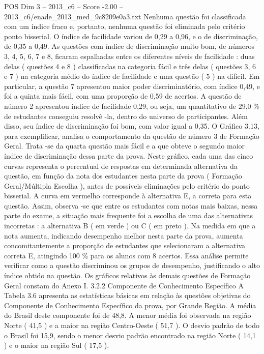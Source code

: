 \begin{textsample}{POS Dim 3 – 2013\_c6 – Score -2.00 – 2013\_c6/enade\_2013\_med\_9c8209e0a3.txt}
Nenhuma questão foi classificada com um índice fraco e, portanto, nenhuma questão foi eliminada pelo critério ponto bisserial.
O índice de facilidade variou de 0,29 a 0,96, e o de discriminação, de 0,35 a 0,49.
As questões com índice de discriminação muito bom, de números 3, 4, 5, 6, 7 e 8, ficaram espalhadas entre os diferentes níveis de facilidade : duas delas ( questões 4 e 8 ) classificadas na categoria fácil e três delas ( questões 3, 6 e 7 ) na categoria médio do índice de facilidade e uma questão ( 5 ) na difícil.
Em particular, a questão 7 apresentou maior poder discriminatório, com índice 0,49, e foi a quinta mais fácil, com uma proporção de 0,59 de acertos.
A questão de número 2 apresentou índice de facilidade 0,29, ou seja, um quantitativo de 29,0 \% de estudantes conseguiu resolvê -la, dentro do universo de participantes.
Além disso, seu índice de discriminação foi bom, com valor igual a 0,35.
O Gráfico 3.13, para exemplificar, analisa o comportamento da questão de número 3 de Formação Geral.
Trata -se da quarta questão mais fácil e a que obteve o segundo maior índice de discriminação dessa parte da prova.
Neste gráfico, cada uma das cinco curvas representa o percentual de respostas em determinada alternativa da questão, em função da nota dos estudantes nesta parte da prova ( Formação Geral/Múltipla Escolha ), antes de possíveis eliminações pelo critério do ponto bisserial.
A curva em vermelho corresponde à alternativa E, a correta para esta questão.
Assim, observa -se que entre os estudantes com notas mais baixas, nessa parte do exame, a situação mais frequente foi a escolha de uma das alternativas incorretas : a alternativa B ( em verde ) ou C ( em preto ).
Na medida em que a nota aumenta, indicando desempenho melhor nesta parte da prova, aumenta concomitantemente a proporção de estudantes que selecionaram a alternativa correta E, atingindo 100 \% para os alunos com 8 acertos.
Essa análise permite verificar como a questão discriminou os grupos de desempenho, justificando o alto índice obtido na questão.
Os gráficos relativos às demais questões de Formação Geral constam do Anexo I. 3.2.2 Componente de Conhecimento Específico A Tabela 3.6 apresenta as estatísticas básicas em relação às questões objetivas do Componente de Conhecimento Específico da prova, por Grande Região.
A média do Brasil deste componente foi de 48,8.
A menor média foi observada na região Norte ( 41,5 ) e a maior na região Centro-Oeste ( 51,7 ).
O desvio padrão de todo o Brasil foi 15,9, sendo o menor desvio padrão encontrado na região Norte ( 14,1 ) e o maior na região Sul ( 17,5 ).

\end{textsample}

